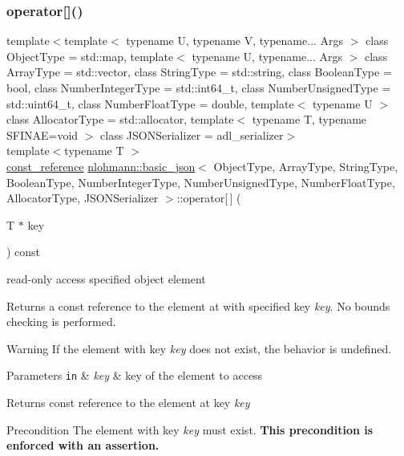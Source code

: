 \subsubsection{\texorpdfstring{operator[]()}{operator[]()}\hspace{0.1cm}{\footnotesize\ttfamily [6/8]}}
{\footnotesize\ttfamily template$<$template$<$ typename U, typename V, typename... Args $>$ class Object\+Type = std\+::map, template$<$ typename U, typename... Args $>$ class Array\+Type = std\+::vector, class String\+Type  = std\+::string, class Boolean\+Type  = bool, class Number\+Integer\+Type  = std\+::int64\+\_\+t, class Number\+Unsigned\+Type  = std\+::uint64\+\_\+t, class Number\+Float\+Type  = double, template$<$ typename U $>$ class Allocator\+Type = std\+::allocator, template$<$ typename T, typename S\+F\+I\+N\+A\+E=void $>$ class J\+S\+O\+N\+Serializer = adl\+\_\+serializer$>$ \\
template$<$typename T $>$ \\
\mbox{\hyperlink{classnlohmann_1_1basic__json_a4057c5425f4faacfe39a8046871786ca}{const\+\_\+reference}} \mbox{\hyperlink{classnlohmann_1_1basic__json}{nlohmann\+::basic\+\_\+json}}$<$ Object\+Type, Array\+Type, String\+Type, Boolean\+Type, Number\+Integer\+Type, Number\+Unsigned\+Type, Number\+Float\+Type, Allocator\+Type, J\+S\+O\+N\+Serializer $>$\+::operator\mbox{[}$\,$\mbox{]} (\begin{DoxyParamCaption}\item[{T $\ast$}]{key }\end{DoxyParamCaption}) const\hspace{0.3cm}{\ttfamily [inline]}}



read-\/only access specified object element 

Returns a const reference to the element at with specified key {\itshape key}. No bounds checking is performed.

\begin{DoxyWarning}{Warning}
If the element with key {\itshape key} does not exist, the behavior is undefined.
\end{DoxyWarning}

\begin{DoxyParams}[1]{Parameters}
\mbox{\tt in}  & {\em key} & key of the element to access\\
\hline
\end{DoxyParams}
\begin{DoxyReturn}{Returns}
const reference to the element at key {\itshape key} 
\end{DoxyReturn}
\begin{DoxyPrecond}{Precondition}
The element with key {\itshape key} must exist. {\bfseries This precondition is enforced with an assertion.}
\end{DoxyPrecond}

